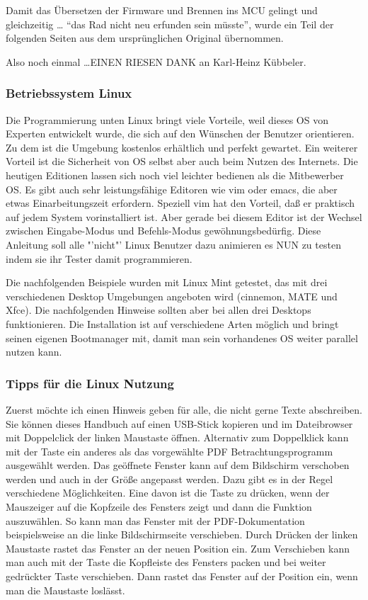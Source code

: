 Damit das Übersetzen der Firmware und Brennen ins MCU gelingt und gleichzeitig \dots
"`das Rad nicht neu erfunden sein müsste"', wurde ein Teil der folgenden Seiten aus dem
ursprünglichen Original übernommen.

Also noch einmal \dots \LARGE{EINEN RIESEN DANK}
\normalsize an Karl-Heinz Kübbeler.

\subsubsection{Betriebssystem Linux}

Die Programmierung unten Linux bringt viele Vorteile, weil dieses OS von Experten entwickelt wurde,
die sich auf den Wünschen der Benutzer orientieren.
Zu dem ist die Umgebung kostenlos erhältlich und perfekt gewartet.
Ein weiterer Vorteil ist die Sicherheit von OS selbst aber auch beim Nutzen des Internets.
Die heutigen Editionen lassen sich noch viel leichter bedienen als die Mitbewerber OS.
Es gibt auch sehr leistungsfähige Editoren wie vim oder emacs, die aber etwas
Einarbeitungszeit erfordern. Speziell vim hat den Vorteil, daß er praktisch auf
jedem System vorinstalliert ist. Aber gerade bei diesem Editor ist der
Wechsel zwischen Eingabe-Modus und Befehls-Modus gewöhnungsbedürfig.
Diese Anleitung soll alle "'nicht"' Linux Benutzer dazu animieren es NUN zu testen
indem sie ihr Tester damit programmieren.

Die nachfolgenden Beispiele wurden mit Linux Mint getestet, das
mit drei verschiedenen Desktop Umgebungen angeboten wird (cinnemon, MATE und Xfce).
Die nachfolgenden Hinweise sollten aber bei allen drei Desktops funktionieren.
Die Installation ist auf verschiedene Arten möglich und bringt seinen eigenen Bootmanager mit,
damit man sein vorhandenes OS weiter parallel nutzen kann.

\subsubsection{Tipps für die Linux Nutzung}

Zuerst möchte ich einen Hinweis geben für alle, die nicht gerne Texte abschreiben.
Sie können dieses Handbuch auf einen USB-Stick kopieren und im Dateibrowser mit Doppelclick der
linken Maustaste \LMB öffnen.
Alternativ zum Doppelklick kann mit der \RMB Taste ein anderes als das
vorgewählte PDF Betrachtungsprogramm ausgewählt werden.
Das geöffnete Fenster kann auf dem Bildschirm verschoben werden und auch in der Größe
angepasst werden. Dazu gibt es in der Regel verschiedene Möglichkeiten.
Eine davon ist die \RMB Taste zu drücken, wenn der Mauszeiger 
auf die Kopfzeile des Fensters zeigt und dann die Funktion  auszuwählen.
So kann man das Fenster mit der PDF-Dokumentation beispielsweise an die linke Bildschirmseite
verschieben. Durch Drücken der linken Maustaste rastet das Fenster an der neuen Position ein.
Zum Verschieben kann man auch mit der \LMB Taste die
Kopfleiste des Fensters packen und bei weiter gedrückter \LMB Taste verschieben.
Dann rastet das Fenster auf der Position ein, wenn man die Maustaste loslässt.

